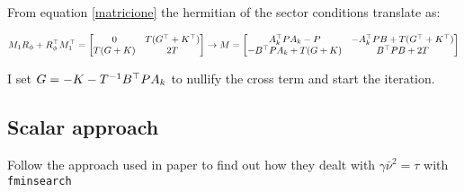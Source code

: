 \documentclass{article}
\begin{document}
From equation \ref{matricione} the hermitian of the sector conditions translate as:

\begin{equation}
  M_1 R_{\phi} + R_{\phi}^\top M_1^\top = \left[\begin{matrix}
    0 & T(G^\top + K^\top)\\
    T(G + K) & 2T
  \end{matrix}\right]  \to M = \left[\begin{matrix}
    A_k^\top P A_k - P & -A_k^\top P B + T(G^\top + K^\top)\\
    -B^\top P A_k + T(G + K) & B^\top P B + 2T
  \end{matrix}\right]
\end{equation}

I set $G = -K - T^{-1} B^\top P A_k$ to nullify the cross term and start the iteration.


\subsection*{Scalar approach}
Follow the approach used in paper \cite{isabelle-paper} to find out how they dealt with $\gamma \bar{\nu}^{2} = \tau$ with \texttt{fminsearch}

\pagebreak
\printbibliography
\end{document}
